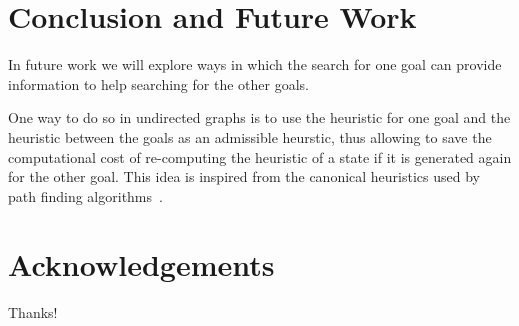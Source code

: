\documentclass{aicom2e}
\begin{document}
\section{Conclusion and Future Work}



In future work we will explore ways in which the search for one goal 
can provide information to help searching for the other goals. 

One way to do so in undirected graphs is to use the heuristic for one goal and the 
heuristic between the goals as an admissible heurstic, thus allowing to save the computational cost of re-computing the heuristic of a state if it is generated again for the other goal. This idea is inspired from the canonical heuristics used by path finding algorithms~\cite{canonical}.




\section*{Acknowledgements}
Thanks!



\end{document}
